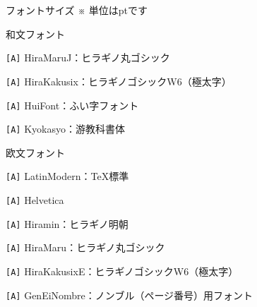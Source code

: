 \begin{multicols*}{2}
\begin{framebox-simple}{フォントサイズ}
\noindent ※ 単位はptです
\end{framebox-simple}
\begin{framebox-simple}{和文フォント}
    \begin{reitemize}
        \item \verb|[A]| HiraMaruJ：ヒラギノ丸ゴシック
        \item \verb|[A]| HiraKakusix：ヒラギノゴシックW6（極太字）
        \item \verb|[A]| HuiFont：ふい字フォント
        \item \verb|[A]| Kyokasyo：游教科書体
    \end{reitemize}
\end{framebox-simple}
\begin{framebox-simple}{欧文フォント}
    \begin{reitemize}
        \item \verb|[A]| LatinModern：\TeX 標準
        \item \verb|[A]| Helvetica
        \item \verb|[A]| Hiramin：ヒラギノ明朝
        \item \verb|[A]| HiraMaru：ヒラギノ丸ゴシック
        \item \verb|[A]| HiraKakusixE：ヒラギノゴシックW6（極太字）
        \item \verb|[A]| GenEiNombre：ノンブル（ページ番号）用フォント
    \end{reitemize}
\end{framebox-simple}


\end{multicols*}

